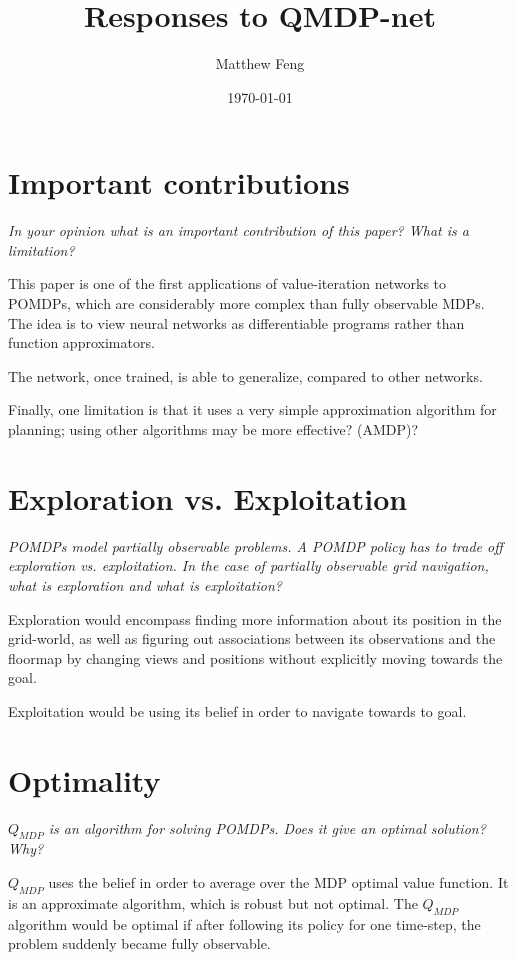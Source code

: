 \documentclass{article}[11pt]
\title{Responses to QMDP-net \cite{DBLP:journals/corr/KarkusHL17}}
\author{Matthew Feng}
\date{\today}
\begin{document}
\maketitle

\section{Important contributions}
{\it
In your opinion what is an important contribution of this paper? What is a limitation?
}

This paper is one of the first applications of value-iteration
networks to POMDPs, which are considerably more complex than
fully observable MDPs. The idea is to view neural networks
as differentiable programs rather than function approximators.

The network, once trained, is able to generalize, compared
to other networks.

Finally, one limitation is that it uses a very simple approximation
algorithm for planning; using other algorithms may be more
effective? (AMDP)?

\section{Exploration vs. Exploitation}
{\it
POMDPs model partially observable problems.
A POMDP policy has to trade off exploration vs. exploitation.
In the case of partially observable grid navigation,
what is exploration and what is exploitation?
}
\newline

Exploration would encompass finding more information about its
position in the grid-world, as well as figuring out
associations between its observations and the floormap by
changing views and positions without explicitly moving
towards the goal.

Exploitation would be using its belief in order to navigate
towards to goal.

\section{Optimality}
{\it
$Q_{MDP}$ is an algorithm for solving POMDPs.
Does it give an optimal solution? Why?
}
\newline

$Q_{MDP}$ uses the belief in order to average over the MDP optimal value
function. It is an approximate algorithm, which is robust but
not optimal. The $Q_{MDP}$ algorithm would be optimal if after following
its policy for one time-step, the problem suddenly became fully
observable.
\end{document}
